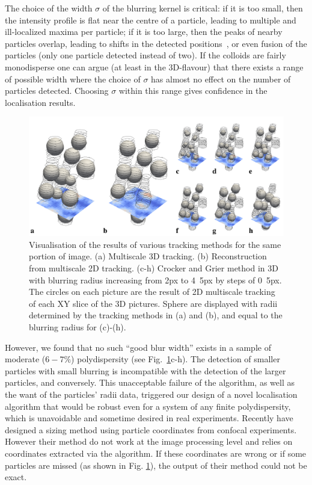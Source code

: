 \documentclass[8.5pt,twoside,twocolumn]{article}
\begin{document}
The choice of the width $\sigma$ of the blurring kernel is critical: if it is too small, then the intensity profile is flat near the centre  of a particle, leading to multiple and ill-localized maxima per particle; if it is too large, then the peaks of nearby particles overlap, leading to shifts in the detected positions~\citep{Jenkins2008}, or even fusion of the particles (only one particle detected instead of two). If the colloids are fairly monodisperse one can argue (at least in the 3D-flavour) that there exists a range of possible width where the choice of $\sigma$ has almost no effect on the number of particles detected. Choosing $\sigma$ within this range gives confidence in the localisation results.

\begin{figure}
\centering
\includegraphics{fig_localise.pdf}
\caption{Visualisation of the results of various tracking methods for the same portion of image. (a) Multiscale 3D tracking. (b) Reconstruction from multiscale 2D tracking. (c-h)  Crocker and Grier method in 3D with blurring radius increasing from \unit{2}{px} to \unit{4.5}{px} by steps of \unit{0.5}{px}. The circles on each picture are the result of 2D multiscale tracking of each XY slice of the 3D pictures. Sphere are displayed with radii determined by the tracking methods in (a) and (b), and equal to the blurring radius for (c)-(h).}
	\label{fig:localise}
\end{figure}

However, we found that no such ``good blur width'' exists in a sample of moderate ($6-7\%$) polydispersity (see Fig.~\ref{fig:localise}c-h). The detection of smaller particles with small blurring is incompatible with the detection of the larger particles, and conversely. This unacceptable failure of the \citet{Crocker1996} algorithm, as well as the want of the particles' radii data, triggered our design of a novel localisation algorithm that would be robust even for a system of any finite polydispersity, which is unavoidable and sometime desired in real experiments. Recently \citet{Kurita2011,Kurita2011b} have designed a sizing method using particle coordinates from confocal experiments. However their method do not work at the image processing level and relies on coordinates extracted via the \citet{Crocker1996} algorithm. If these coordinates are wrong or if some particles are missed (as shown in Fig. \ref{fig:localise}), the output of their method could not be exact.
\end{document}
